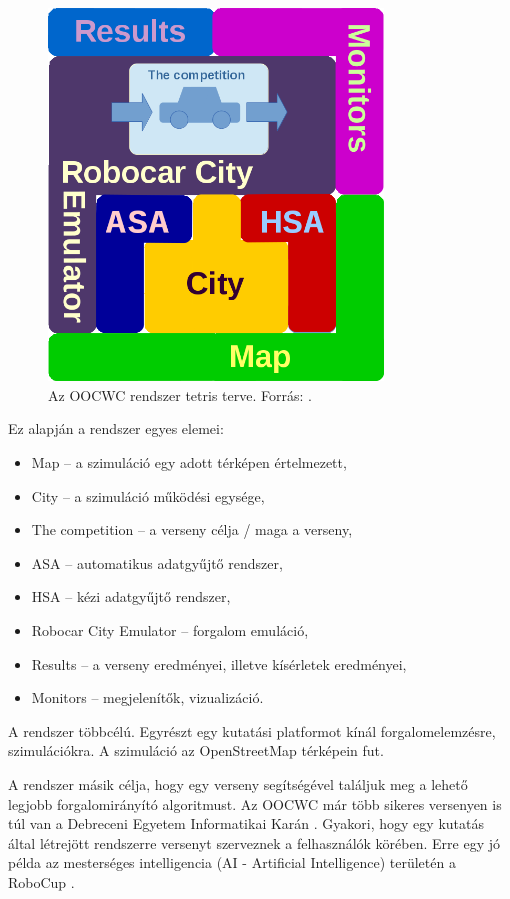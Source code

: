 \documentclass[a4paper,12pt]{report}
\begin{document}
\begin{figure}[h]
\centerline{
\includegraphics[width=3.5in]{img/tetris_plan}}
\caption{Az OOCWC rendszer tetris terve. Forrás: \cite{oocwcrepo}.}
\label{basedesign}
\end{figure}

Ez alapján a rendszer egyes elemei:

\begin{itemize}
\item Map -- a szimuláció egy adott térképen értelmezett,
\item City -- a szimuláció működési egysége,
\item The competition -- a verseny célja / maga a verseny,
\item ASA -- automatikus adatgyűjtő rendszer,
\item HSA -- kézi adatgyűjtő rendszer,
\item Robocar City Emulator -- forgalom emuláció,
\item Results -- a verseny eredményei, illetve kísérletek eredményei,
\item Monitors -- megjelenítők, vizualizáció.
\end{itemize}

A rendszer többcélú. Egyrészt egy kutatási platformot kínál forgalomelemzésre, szimulációkra. A szimuláció az OpenStreetMap \cite{osm} térképein fut. 

\vspace{2mm}
A rendszer másik célja, hogy egy verseny segítségével találjuk meg a lehető legjobb forgalomirányító algoritmust. Az OOCWC már több sikeres versenyen is túl van a Debreceni Egyetem Informatikai Karán \cite{competitions}. Gyakori, hogy egy kutatás által létrejött rendszerre versenyt szerveznek a felhasználók körében. Erre egy jó példa az mesterséges intelligencia (AI - Artificial Intelligence) területén a RoboCup \cite{robocup}.
\end{document}
